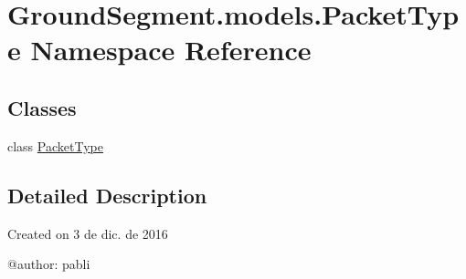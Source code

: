 \hypertarget{namespace_ground_segment_1_1models_1_1_packet_type}{}\section{Ground\+Segment.\+models.\+Packet\+Type Namespace Reference}
\label{namespace_ground_segment_1_1models_1_1_packet_type}
\subsection*{Classes}
\begin{DoxyCompactItemize}
\item 
class \hyperlink{class_ground_segment_1_1models_1_1_packet_type_1_1_packet_type}{Packet\+Type}
\end{DoxyCompactItemize}


\subsection{Detailed Description}
\begin{DoxyVerb}Created on 3 de dic. de 2016

@author: pabli
\end{DoxyVerb}
 